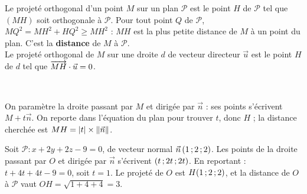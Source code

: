 
\noindent
\begin{minipage}[c]{0.58\linewidth}
\begin{definition}
\raggedright
Le projeté orthogonal d'un point $M$ sur un plan $\mathcal{P}$ est le point $H$ de $\mathcal{P}$ tel que $(MH)$ soit orthogonale à
$\mathcal{P}$. Pour tout point $Q$ de $\mathcal{P}$, $MQ^2=MH^2+HQ^2\geq MH^2$ : $MH$ est la plus petite distance de $M$ à un point
du plan. C'est la \textbf{distance} de $M$ à $\mathcal{P}$.\\[1mm]
Le projeté orthogonal de $M$ sur une droite $d$ de vecteur directeur $\vec u$ est le point $H$ de $d$ tel que $\overrightarrow{MH}\cdot\vec u=0$.
\end{definition}
\end{minipage}\hfill
\begin{minipage}[c]{0.38\linewidth}
\centering
{}\\[0.5mm]
\end{minipage}

\begin{savoirfaire}
On paramètre la droite passant par $M$ et dirigée par $\vec n$ : ses points s'écrivent $M+t\vec n$. On reporte dans l'équation du plan
pour trouver $t$, donc $H$ ; la distance cherchée est $MH=|t|\times\left\lVert\vec n\right\rVert$.
\end{savoirfaire}

\begin{exemple}
Soit $\mathcal{P}:x+2y+2z-9=0$, de vecteur normal $\vec n\,(1\,{;}\,2\,{;}\,2)$. Les points de la droite passant par $O$ et dirigée par $\vec n$
s'écrivent $(t\,{;}\,2t\,{;}\,2t)$. En reportant : $t+4t+4t-9=0$, soit $t=1$. Le projeté de $O$ est $H(1\,{;}\,2\,{;}\,2)$, et la distance de $O$ à
$\mathcal{P}$ vaut $OH=\sqrt{1+4+4}=3$.
\end{exemple}

